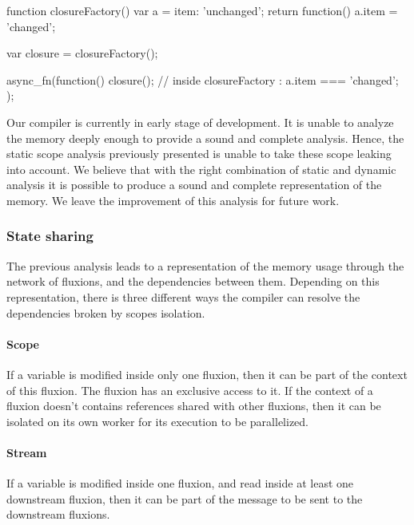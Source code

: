 \begin{code}[js, caption={Example of a scope leak due to a closure},label={lst:closure}]
function closureFactory() {
  var a = {item: 'unchanged'};
  return function() {
    a.item = 'changed';
  }
}

var closure = closureFactory();

async_fn(function() {
  closure();
  // inside closureFactory : a.item === 'changed';
});
\end{code}

Our compiler is currently in early stage of development.
It is unable to analyze the memory deeply enough to provide a sound and complete analysis.
Hence, the static scope analysis previously presented is unable to take these scope leaking into account.
We believe that with the right combination of static and dynamic analysis it is possible to produce a sound and complete representation of the memory.
We leave the improvement of this analysis for future work.

\subsubsection{State sharing}

The previous analysis leads to a representation of the memory usage through the network of fluxions, and the dependencies between them.
Depending on this representation, there is three different ways the compiler can resolve the dependencies broken by scopes isolation.

\paragraph{Scope}
If a variable is modified inside only one fluxion, then it can be part of the context of this fluxion.
The fluxion has an exclusive access to it.
If the context of a fluxion doesn't contains references shared with other fluxions, then it can be isolated on its own worker for its execution to be parallelized.

\paragraph{Stream}
If a variable is modified inside one fluxion, and read inside at least one downstream fluxion, then it can be part of the message to be sent to the downstream fluxions.

